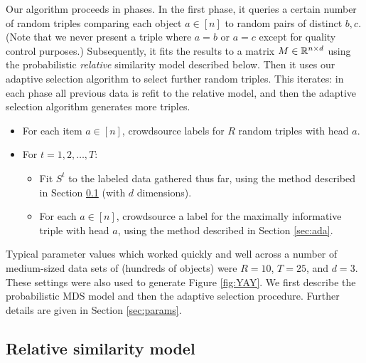 \documentclass{article}
\begin{document}
Our algorithm proceeds in phases.  In the first phase, it queries a certain number of random triples comparing each object $a \in [n]$ to random pairs of distinct $b,c$.  (Note that we never present a triple where $a=b$ or $a=c$ except for quality control purposes.) Subsequently, it fits the results to a matrix $M \in \mathbb{R}^{n \times d}$ using the probabilistic {\em relative} similarity model described below.  Then it uses our adaptive selection algorithm to select further random triples.  This iterates: in each phase all previous data is refit to the relative model, and then the adaptive selection algorithm generates more triples.
\begin{itemize}
\item For each item $a\in [n]$, crowdsource labels for $R$ random triples with head $a$.
\item For $t=1,2,\ldots,T:$
\begin{itemize}
\item Fit $S^t$ to the labeled data gathered thus far, using the method described in Section \ref{sec:rel} (with $d$ dimensions).
\item For each $a\in [n]$, crowdsource a label for the maximally informative triple with head $a$, using the method described in Section \ref{sec:ada}.
\end{itemize}
\end{itemize}
Typical parameter values which worked quickly and well across a number of medium-sized data sets of (hundreds of objects) were $R=10$, $T=25$, and $d=3$.  These settings were also used to generate Figure \ref{fig:YAY}.  We first describe the probabilistic MDS model and then the adaptive selection procedure.  Further details are given in Section \ref{sec:params}.

\subsection{Relative similarity model}\label{sec:rel}
\end{document}
